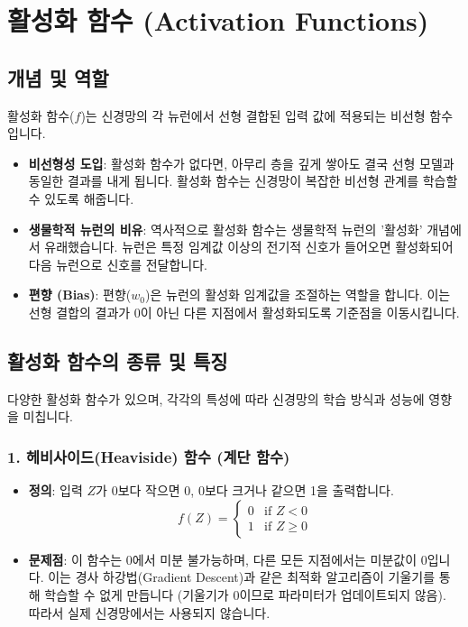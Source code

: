 \documentclass[11pt,a4paper]{book}
\theoremstyle{definition}
\begin{document}
\section*{활성화 함수 (Activation Functions)}

\subsection*{개념 및 역할}
활성화 함수($f$)는 신경망의 각 뉴런에서 선형 결합된 입력 값에 적용되는 비선형 함수입니다.
\begin{itemize}
    \item \textbf{비선형성 도입}: 활성화 함수가 없다면, 아무리 층을 깊게 쌓아도 결국 선형 모델과 동일한 결과를 내게 됩니다. 활성화 함수는 신경망이 복잡한 비선형 관계를 학습할 수 있도록 해줍니다.
    \item \textbf{생물학적 뉴런의 비유}: 역사적으로 활성화 함수는 생물학적 뉴런의 '활성화' 개념에서 유래했습니다. 뉴런은 특정 임계값 이상의 전기적 신호가 들어오면 활성화되어 다음 뉴런으로 신호를 전달합니다.
    \item \textbf{편향 (Bias)}: 편향($w_0$)은 뉴런의 활성화 임계값을 조절하는 역할을 합니다. 이는 선형 결합의 결과가 0이 아닌 다른 지점에서 활성화되도록 기준점을 이동시킵니다.
\end{itemize}

\subsection*{활성화 함수의 종류 및 특징}
다양한 활성화 함수가 있으며, 각각의 특성에 따라 신경망의 학습 방식과 성능에 영향을 미칩니다.

\subsubsection*{1. 헤비사이드(Heaviside) 함수 (계단 함수)}
\begin{itemize}
    \item \textbf{정의}: 입력 $Z$가 0보다 작으면 0, 0보다 크거나 같으면 1을 출력합니다.
    \[ f(Z) = \begin{cases} 0 & \text{if } Z < 0 \\ 1 & \text{if } Z \ge 0 \end{cases} \]
    \item \textbf{문제점}: 이 함수는 0에서 미분 불가능하며, 다른 모든 지점에서는 미분값이 0입니다. 이는 경사 하강법(Gradient Descent)과 같은 최적화 알고리즘이 기울기를 통해 학습할 수 없게 만듭니다 (기울기가 0이므로 파라미터가 업데이트되지 않음). 따라서 실제 신경망에서는 사용되지 않습니다.
\end{itemize}
\end{document}
